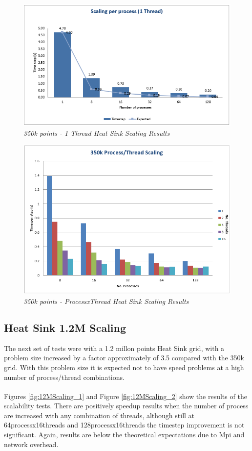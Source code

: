 \documentclass[12pt]{article}
\begin{document}
\begin{figure}[h!]
    \includegraphics[scale=0.9]{scaling350k_1.png}
    \centering
    \caption{\textit{350k points - 1 Thread Heat Sink Scaling Results}}
    \label{fig:350kScaling_1}
\end{figure}

\begin{figure}[h!]
    \includegraphics[scale=0.8]{scaling350k_2.png}
    \centering
    \caption{\textit{350k points - ProcessxThread Heat Sink Scaling Results}}
    \label{fig:350kScaling_2}
\end{figure}

\subsection{Heat Sink 1.2M Scaling}
The next set of tests were with a 1.2 millon points Heat Sink grid,  with a problem size increased by a factor approximately of 3.5 compared with the 350k grid. With this problem size it is expected not to have speed problems at a high number of process/thread combinations.
\\\\
Figures \ref{fig:12MScaling_1} and Figure \ref{fig:12MScaling_2}
show the results of the scalability tests. There are positively speedup results when the number of process are increased with any combination of threads, although still at 64processx16threads and 128processx16threads the timestep improvement is not significant. Again, results are below the theoretical expectations due to Mpi and network overhead.
\end{document}
